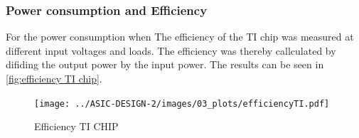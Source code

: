 \subsubsection{Power consumption and Efficiency}
For the power consumption when 
The efficiency of the TI chip was measured at different input voltages and loads. The efficiency was thereby callculated by difiding the output power by the input power. The results can be seen in \autoref{fig:efficiency TI chip}.
\begin{figure}[h]
    \centering
    \texttt{[image: ../ASIC-DESIGN-2/images/03\_plots/efficiencyTI.pdf]}
    \caption{Efficiency TI CHIP}
    \label{fig:efficiency TI chip}
\end{figure}
